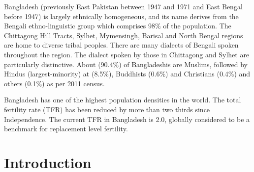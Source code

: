 \documentclass[a4paper,12pt]{article}
\begin{document}
Bangladesh (previously East Pakistan between 1947 and 1971 and East Bengal before 1947) is largely ethnically homogeneous, and its name derives from the Bengali ethno-linguistic group which comprises 98\% of the population. The Chittagong Hill Tracts, Sylhet, Mymensingh, Barisal and North Bengal regions are home to diverse tribal peoples. There are many dialects of Bengali spoken throughout the region. The dialect spoken by those in Chittagong and Sylhet are particularly distinctive. About (90.4\%) of Bangladeshis are Muslims, followed by Hindus (largest-minority) at (8.5\%), Buddhists (0.6\%) and Christians (0.4\%) and others (0.1\%) as per 2011 census.

Bangladesh has one of the highest population densities in the world. The total fertility rate (TFR) has been reduced by more than two thirds since Independence. The current TFR in Bangladesh is 2.0, globally considered to be a benchmark for replacement level fertility.
 \newline

\newpage

\setlength{\parskip}{0.5ex plus 0.5ex minus 0.2ex}

\small\tableofcontents
\setlength{\parskip}{2ex plus 0.5ex minus 0.2ex}
\newpage






\pagestyle{plain}

\section{Introduction}\label{introduction}
\end{document}
